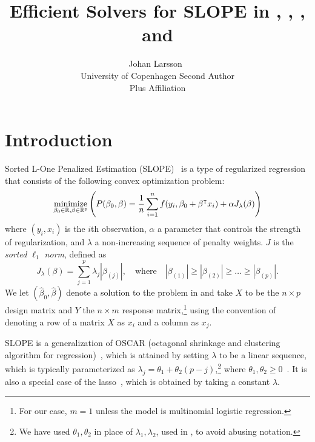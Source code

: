 \documentclass[article]{jss}
\author{Johan Larsson~\orcidlink{0000-0002-4029-5945}\\University of Copenhagen
   \And Second Author\\Plus Affiliation}
\title{Efficient Solvers for SLOPE in \proglang{R}, \proglang{Python}, \proglang{Julia}, and \proglang{C++}}
\let\Cref\crtCref
\begin{document}
\section{Introduction}

Sorted L-One Penalized Estimation
(SLOPE)~\citep{bogdan2013,zeng2014,bogdan2015} is a type of
regularized regression that consists of the following convex optimization problem:
\begin{equation}
  \label{eq:slope}
  \operatorname*{minimize}_{\beta_0 \in \mathbb{R},\beta \in \mathbb{R}^p}
  \left(
  P(\beta_0,\beta)
  = \frac{1}{n} \sum_{i=1}^n f(y_i, \beta_0
  + \beta^\intercal x_i) + \alpha J_{\lambda}(\beta)
  \right)
\end{equation}
where \((y_i, x_i)\) is the \(i\)th observation, \(\alpha\) a parameter
that controls the strength of regularization, and \(\lambda\) a non-increasing sequence of penalty weights. \(J\) is the
\emph{sorted $\ell_1$ norm}, defined as
\begin{equation}
  \label{eq:sl1}
  J_{\lambda}(\beta) = \sum_{j=1}^p \lambda_j |\beta_{(j)}|, \quad
  \text{where}\quad |\beta_{(1)}| \geq |\beta_{(2)}| \geq \ldots \geq
  |\beta_{(p)}|.
\end{equation}
We let \((\hat{\beta}_0, \hat{\beta})\) denote a solution to the problem in \Cref{eq:slope}
and take \(X\) to be the \(n \times p\) design matrix and \(Y\) the
\(n \times m\) response matrix,\footnote{For our case, \(m = 1\) unless
  the model is multinomial logistic regression.} using the convention
of denoting a row of a matrix \(X\) as \(x_i\) and a column as \(x_j\).

SLOPE is a generalization of OSCAR (octagonal shrinkage and clustering
algorithm for regression)~\citep{bondell2008}, which is attained by
setting \(\lambda\) to be a linear sequence, which is typically parameterized as
\(\lambda_j = \theta_1 + \theta_2(p - j)\),\footnote{We have used \(\theta_1,\theta_2\) in place of
  \(\lambda_1,\lambda_2\), used in \citet{bondell2008}, to avoid abusing notation.} where \(\theta_1, \theta_2
\geq 0\)~\citep{figueiredo2014}. It is also a special case of
the lasso~\citep{santosa1986,donoho1994,donoho1995,tibshirani1996},
which is obtained by taking a constant \(\lambda\).


\end{document}
